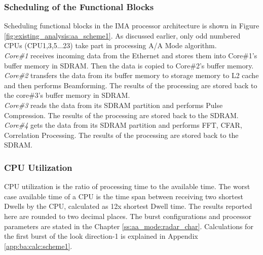 \subsubsection{Scheduling of the Functional Blocks}
\label{sss:scheme1:aa:sched_blocks}
Scheduling functional blocks in the IMA processor architecture is shown in Figure \ref{fig:existing_analysis:aa_scheme1}. As discussed earlier, only odd numbered CPUs (CPU1,3,5...23) take part in processing A/A Mode algorithm.\\[0.3cm]
\textsl{Core\#1} receives incoming data from the Ethernet and stores them into Core\#1's buffer memory in SDRAM. Then the data is copied to Core\#2's buffer memory.\\[0.2cm]
\textsl{Core\#2} transfers the data from its buffer memory to storage memory to L2 cache and then performs Beamforming. The results of the processing are stored back to the core\#3's buffer memory in SDRAM.\\[0.2cm]
\textsl{Core\#3} reads the data from its SDRAM partition and performs Pulse Compression. The results of the processing are stored back to the SDRAM.\\[0.2cm]
\textsl{Core\#4} gets the data from its SDRAM partition and performs FFT, CFAR, Correlation Processing. The results of the processing are stored back to the SDRAM.

\subsubsection{CPU Utilization}
\label{sss:scheme1:aa:cpu_util}
CPU utilization is the ratio of processing time to the available time. The worst case available time of a CPU is the time span between receiving two shortest Dwells by the CPU, calculated as 12x shortest Dwell time. The results reported here are rounded to two decimal places. The burst configurations and processor parameters are stated in the Chapter \ref{ss:aa_mode:radar_char}. Calculations for the first burst of the look direction-1 is explained in Appendix \ref{app:ba:calc:scheme1}.

